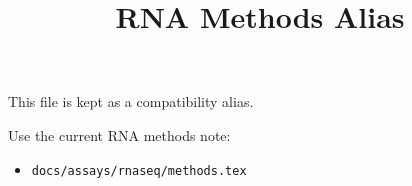 \documentclass[11pt]{article}
\title{RNA Methods Alias}
\author{}
\date{}
\begin{document}
\maketitle

This file is kept as a compatibility alias.

Use the current RNA methods note:
\begin{itemize}
\item \texttt{docs/assays/rnaseq/methods.tex}
\end{itemize}
\end{document}
